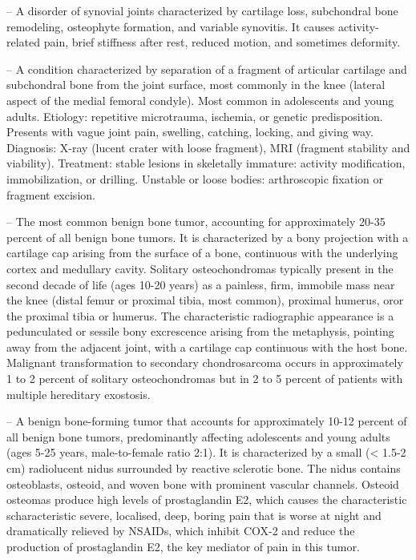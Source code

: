 -- A disorder of synovial joints characterized by cartilage loss, subchondral bone remodeling, osteophyte formation, and variable synovitis. It causes activity-related pain, brief stiffness after rest, reduced motion, and sometimes deformity.

-- A condition characterized by separation of a fragment of articular cartilage and subchondral bone from the joint surface, most commonly in the knee (lateral aspect of the medial femoral condyle). Most common in adolescents and young adults. Etiology: repetitive microtrauma, ischemia, or genetic predisposition. Presents with vague joint pain, swelling, catching, locking, and giving way. Diagnosis: X-ray (lucent crater with loose fragment), MRI (fragment stability and viability). Treatment: stable lesions in skeletally immature: activity modification, immobilization, or drilling. Unstable or loose bodies: arthroscopic fixation or fragment excision.

-- The most common benign bone tumor, accounting for approximately 20-35 percent of all benign bone tumors. It is characterized by a bony projection with a cartilage cap arising from the surface of a bone, continuous with the underlying cortex and medullary cavity. Solitary osteochondromas typically present in the second decade of life (ages 10-20 years) as a painless, firm, immobile mass near the knee (distal femur or proximal tibia, most common), proximal humerus, oror the proximal tibia or humerus. The characteristic radiographic appearance is a pedunculated or sessile bony excrescence arising from the metaphysis, pointing away from the adjacent joint, with a cartilage cap continuous with the host bone. Malignant transformation to secondary chondrosarcoma occurs in approximately 1 to 2 percent of solitary osteochondromas but in 2 to 5 percent of patients with multiple hereditary exostosis.

-- A benign bone-forming tumor that accounts for approximately 10-12 percent of all benign bone tumors, predominantly affecting adolescents and young adults (ages 5-25 years, male-to-female ratio 2:1). It is characterized by a small (< 1.5-2 cm) radiolucent nidus surrounded by reactive sclerotic bone. The nidus contains osteoblasts, osteoid, and woven bone with prominent vascular channels. Osteoid osteomas produce high levels of prostaglandin E2, which causes the characteristic scharacteristic severe, localised, deep, boring pain that is worse at night and dramatically relieved by NSAIDs, which inhibit COX-2 and reduce the production of prostaglandin E2, the key mediator of pain in this tumor.

